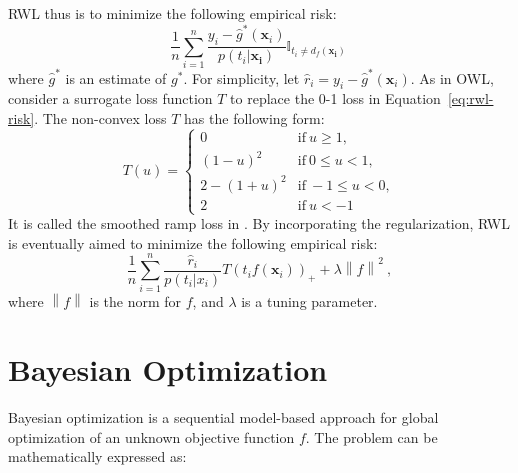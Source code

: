 \documentclass{article}
\begin{document}
RWL thus is to minimize the following empirical risk:
\begin{equation}
   \frac{1}{n}\sum_{i=1}^{n}\frac{y_i-\hat{g}^{*}(\mathbf{x}_i)}{p(t_i|\mathbf{x_i})}\mathbb{I}_{t_i \neq
    d_f(\mathbf{x_i})}
  ~\label{eq:rwl-risk}
\end{equation}
where $\hat{g}^{*}$ is an estimate of $g^{*}$. For simplicity, let
$\hat{r}_i = y_i - \hat{g}^{*}(\mathbf{x}_i)$. As in OWL,
\cite{Zhou_undated-ps} consider a surrogate loss function $T$ to replace
the 0-1 loss in Equation~\ref{eq:rwl-risk}. The non-convex loss $T$
has the following form:
\begin{equation}
T(u) =  \left\{\begin{array}{ll}
 0 & \mathrm{if} \: u \geq 1, \\ 
 (1-u)^2 & \mathrm{if} \: 0 \leq u < 1, \\ 
 2-(1+u)^2 & \mathrm{if} \: -1 \leq u < 0, \\ 
 2 & \mathrm{if} \: u < -1
\end{array}\right.
\end{equation}
It is called the smoothed ramp loss in \cite{Zhou_undated-ps}. By
incorporating the regularization, RWL is eventually aimed to minimize
the following empirical risk:
\begin{equation}
    \frac{1}{n}\sum_{i=1}^{n}\frac{\hat{r}_i}{p(t_i|x_i)}T(t_if(\mathbf{x}_i))_{+}+\lambda\left
    \| f \right \|^2 ~\label{eq:d_owl_empirical_min},
\end{equation}
where $\left \| f \right \|$ is the norm for $f$, and $\lambda$ is a
tuning parameter.
\section{Bayesian Optimization}
Bayesian optimization is a sequential model-based approach for global
optimization of an unknown objective function $f$. The problem can be
mathematically expressed as:
\end{document}
